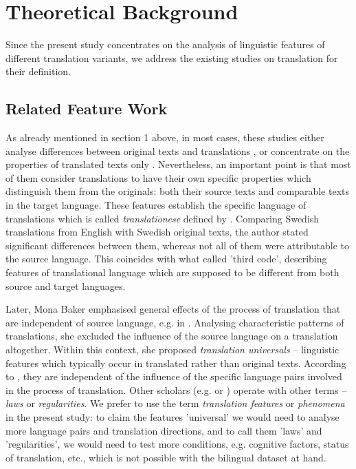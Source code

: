 \documentclass[output=paper]{LSP/langsci}
\begin{document}
\section{Theoretical Background}

Since the present study concentrates on the analysis of linguistic features of different translation variants, we address the existing studies on translation for their deﬁnition.

\subsection{Related Feature Work}

As already mentioned in section 1 above, in most cases, these studies either analyse differences between original texts and translations \citep{House1997,Matthiessen2001,Teich2003,Hansen2003,Steiner2004}, or concentrate on the properties of translated texts only  \citep{Baker1995}. Nevertheless, an important point is that most of them consider translations to have their own speciﬁc properties which distinguish them from the originals: both their source texts and comparable texts in the target language. These features establish the speciﬁc language of translations which is called \textit{translationese} defined by \citep{Gellerstam1986}. Comparing Swedish translations from English with Swedish original texts, the author stated signiﬁcant differences between them, whereas not all of them were attributable to the source language. This coincides with what \citet{Frawley1984} called 'third code’, describing features of translational language which are supposed to be different from both source and target languages.

Later, Mona Baker emphasised general effects of the process of translation that are independent of source language, e.g. in \citep{Baker1993,Baker1995}. Analysing characteristic patterns of translations, she excluded the influence of the source language on a translation altogether. Within this context, she proposed \textit{translation universals} – linguistic features which typically occur in translated rather than original texts. According to \citet{Baker1993}, they are independent of the influence of the speciﬁc language pairs involved in the process of translation. Other scholars (e.g. \citealt{Toury1995} or \citealt{Chesterman2004}) operate with other terms – \textit{laws} or \textit{regularities}. We prefer to use the term \textit{translation features} or \textit{phenomena} in the present study: to claim the features 'universal’ we would need to analyse more language pairs and translation directions, and to call them 'laws’ and 'regularities’, we would need to test more conditions, e.g. cognitive factors, status of translation, etc., which is not possible with the bilingual dataset at hand.
\end{document}
